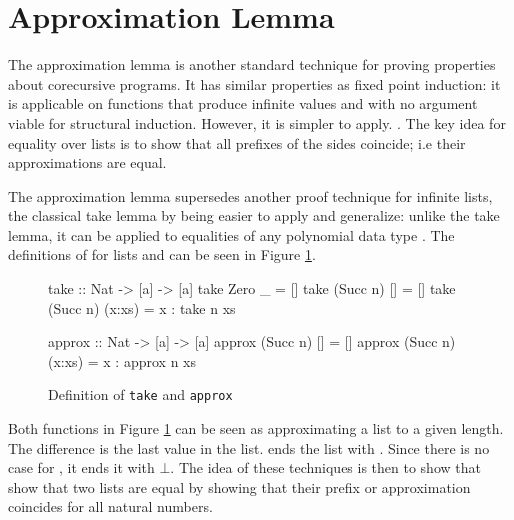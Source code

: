 \section{Approximation Lemma}
\label{sec:approx}

The approximation lemma is another standard technique for proving
properties about corecursive programs. It has similar properties as
fixed point induction: it is applicable on functions that produce
infinite values and with no argument viable for structural induction.
However, it is simpler to apply. \citep{corecursive}. The key idea for
equality over lists is to show that all prefixes of the sides
coincide; i.e their approximations are equal.

The approximation lemma supersedes another proof technique for
infinite lists, the classical take lemma \citep{introfp} by being
easier to apply and generalize: unlike the take lemma, it can be
applied to equalities of any polynomial data type
\citep{genapprox}. The definitions of  for lists and
 can be seen in Figure \ref{code:takeapprox}.

\begin{figure}[h!]
\centering
\begin{minipage}[b]{6.2cm}
\begin{code}
take :: Nat -> [a] -> [a]
take Zero    _      = []
take (Succ n) []     = []
take (Succ n) (x:xs) = x : take n xs
\end{code}
\end{minipage}
\hspace{10pt}
\begin{minipage}[b]{6.7cm}
\begin{code}
approx :: Nat -> [a] -> [a]
approx (Succ n) []     = []
approx (Succ n) (x:xs) = x : approx n xs
\end{code}
\end{minipage}
\caption{Definition of \texttt{take} and \texttt{approx}
\label{code:takeapprox}
}
\end{figure}

Both functions in Figure \ref{code:takeapprox} can be seen as
approximating a list to a given length. The difference is the last
value in the list.  ends the list with \hs{[]}. Since there
is no  case for , it ends it with $\bot$.  The
idea of these techniques is then to show that show that two lists are
equal by showing that their prefix or approximation coincides for all
natural numbers.

